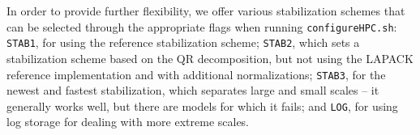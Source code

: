 
In order to provide further flexibility, we offer various stabilization schemes that can be selected through the appropriate flags when running \texttt{configureHPC.sh}: \texttt{STAB1}, for using the reference stabilization scheme;
\texttt{STAB2}, which sets a stabilization scheme based on the QR decomposition, but not using the LAPACK reference implementation and with additional normalizations;
\texttt{STAB3}, for the newest and fastest stabilization, which separates large and small scales -- it generally works well, but there are models for which it fails;
and \texttt{LOG}, for using log storage for dealing with more extreme scales.



